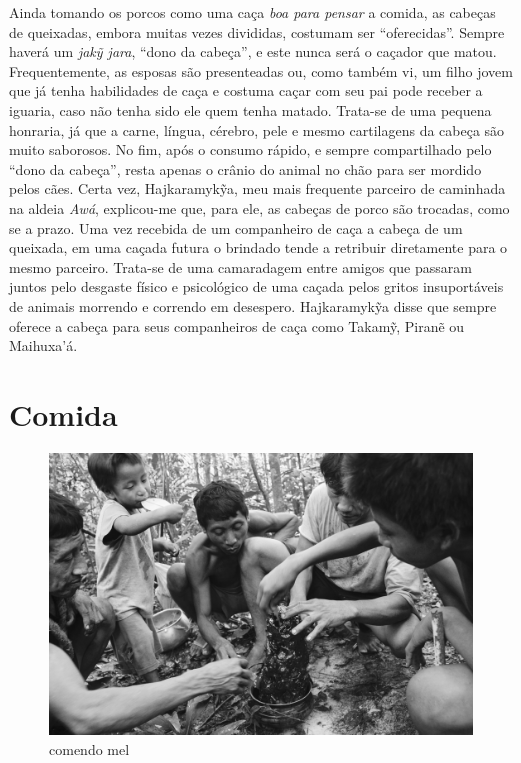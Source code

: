 Ainda tomando os porcos como uma caça \emph{boa para pensar} a comida,
as cabeças de queixadas, embora muitas vezes divididas, costumam ser
``oferecidas''. Sempre haverá um \emph{jakỹ jara}, ``dono da cabeça'', e
este nunca será o caçador que matou. Frequentemente, as esposas são
presenteadas ou, como também vi, um filho jovem que já tenha habilidades
de caça e costuma caçar com seu pai pode receber a iguaria, caso não
tenha sido ele quem tenha matado. Trata-se de uma pequena honraria, já
que a carne, língua, cérebro, pele e mesmo cartilagens da cabeça são
muito saborosos. No fim, após o consumo rápido, e sempre compartilhado
pelo ``dono da cabeça'', resta apenas o crânio do animal no chão para
ser mordido pelos cães. Certa vez, Hajkaramykỹa, meu mais frequente
parceiro de caminhada na aldeia \emph{Awá}, explicou-me que, para ele,
as cabeças de porco são trocadas, como se a prazo. Uma vez recebida de
um companheiro de caça a cabeça de um queixada, em uma caçada futura o
brindado tende a retribuir diretamente para o mesmo parceiro. Trata-se
de uma camaradagem entre amigos que passaram juntos pelo desgaste físico
e psicológico de uma caçada pelos gritos insuportáveis de animais
morrendo e correndo em desespero. Hajkaramykỹa disse que sempre oferece
a cabeça para seus companheiros de caça como Takamỹ, Piranẽ ou
Maihuxa'á.

\section{Comida}

\begin{figure}[H]
\centering
  \includegraphics[width=\textwidth]{./imgs/IMG_1672}
\caption{comendo mel}
\end{figure}

